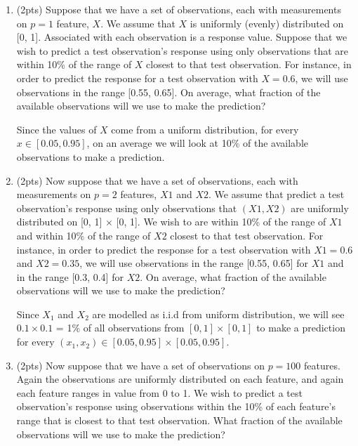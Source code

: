 \documentclass[a4paper]{article}
\theoremstyle{definition}
\newenvironment{soln}{
    \leavevmode\color{blue}\ignorespaces
}{}
\begin{document}
\begin{enumerate}
\begin{enumerate}
	\item (2pts) Suppose that we have a set of observations, each with measurements on $p=1$ feature, $X$. We assume that $X$ is uniformly (evenly) distributed on [0, 1]. Associated with each observation is a response value. Suppose that we wish to predict a test observation’s response using only observations that are within 10\% of the range of $X$ closest to that test observation. For instance, in order to predict the response for a test observation with $X=0.6$, we will use observations in the range [0.55, 0.65]. On average, what fraction of the available observations will we use to make the prediction?
	
	\begin{soln}
    Since the values of $X$ come from a uniform distribution, for every $x \in [0.05, 0.95]$, on an average we will look at 10\% of the available observations to make a prediction.
    \end{soln}
	
	
	\item (2pts) Now suppose that we have a set of observations, each with measurements on $p =2$ features, $X1$ and $X2$. We assume that predict a test observation’s response using only observations that $(X1,X2)$ are uniformly distributed on [0, 1] × [0, 1]. We wish to are within 10\% of the range of $X1$ and within 10\% of the range of $X2$ closest to that test observation. For instance, in order to predict the response for a test observation with $X1 =0.6$ and $X2 =0.35$, we will use observations in the range [0.55, 0.65] for $X1$ and in the range [0.3, 0.4] for $X2$. On average, what fraction of the available observations will we use to make the prediction?
	
	\begin{soln}  Since $X_1$ and $X_2$ are modelled as i.i.d from uniform distribution, we will see $0.1 \times 0.1$ = 1\% of all observations from $[0, 1] \times [0, 1]$ to make a prediction for every $(x_1, x_2) \in [0.05, 0.95] \times [0.05, 0.95]$. \end{soln}
	
	\item (2pts) Now suppose that we have a set of observations on $p = 100$ features. Again the observations are uniformly distributed on each feature, and again each feature ranges in value from 0 to 1. We wish to predict a test observation’s response using observations within the 10\% of each feature’s range that is closest to that test observation. What fraction of the available observations will we use to make the prediction?
	

\end{enumerate}
\end{enumerate}
\end{document}
